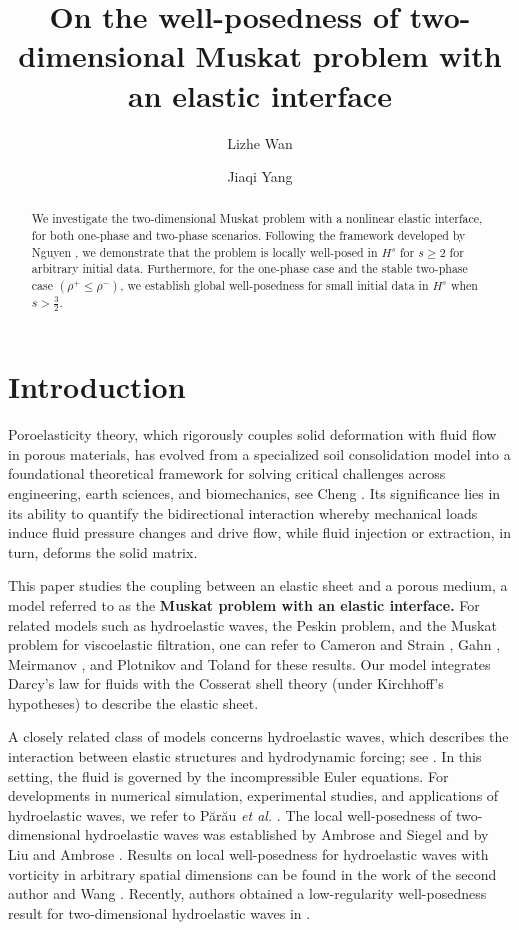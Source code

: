 \documentclass[12pt]{amsart}
\author{Lizhe Wan}
\author{Jiaqi Yang}
\theoremstyle{definition}
\numberwithin{equation}{section}
\newcommand{\f}{\frac}
\begin{document}
\title{On the well-posedness of two-dimensional Muskat problem with an elastic interface}

\begin{abstract}
We investigate the two-dimensional Muskat problem with a nonlinear elastic interface, for both one-phase and two-phase scenarios.
Following the framework developed by Nguyen \cite{MR4131404, MR4348695}, we demonstrate that the problem is locally well-posed in $H^s$ for $s\geq 2$ for arbitrary initial data.
Furthermore, for the one-phase case and the stable two-phase case $(\rho^+ \leq \rho^-)$, we establish global well-posedness for small initial data in $H^s$ when $s> \f32$.
\end{abstract}

\maketitle
\tableofcontents

\section{Introduction} \label{s:Intro}
Poroelasticity theory, which rigorously couples solid deformation with fluid flow in porous materials, has evolved from a specialized soil consolidation model into a foundational theoretical framework for solving critical challenges across engineering, earth sciences, and biomechanics, see Cheng \cite{cheng2016poroelasticity}. 
Its significance lies in its ability to quantify the bidirectional interaction whereby mechanical loads induce fluid pressure changes and drive flow, while fluid injection or extraction, in turn, deforms the solid matrix. 

This paper studies the coupling between an elastic sheet and a porous medium, a model referred to as the \textbf{Muskat problem with an elastic interface.}
For related models such as hydroelastic waves, the Peskin problem, and the Muskat problem for viscoelastic filtration, one can refer to  Cameron and Strain \cite{MR4673875}, Gahn \cite{MR4959949}, Meirmanov \cite{MR2863467}, and Plotnikov and Toland \cite{MR2812947} for these results.
Our model integrates Darcy’s law for fluids with the Cosserat shell theory (under Kirchhoff’s hypotheses) to describe the elastic sheet. 

A closely related class of models concerns hydroelastic waves, which describes the interaction between elastic structures and hydrodynamic forcing; see \cite{MR2812947}. 
In this setting, the fluid is governed by the incompressible Euler equations.
For developments in numerical simulation, experimental studies, and applications of hydroelastic waves, we refer to Părău \textit{et al.} \cite{MR2812939}. 
The local well-posedness of two-dimensional hydroelastic waves was established by Ambrose and Siegel \cite{MR3656704} and by Liu and Ambrose \cite{MR3608168}. 
Results on local well-posedness for hydroelastic waves with vorticity in arbitrary spatial dimensions can be found in the work of the second author and Wang \cite{MR4104949}. 
Recently, authors obtained a low-regularity well-posedness result for two-dimensional hydroelastic waves in \cite{WanY}.
\end{document}
